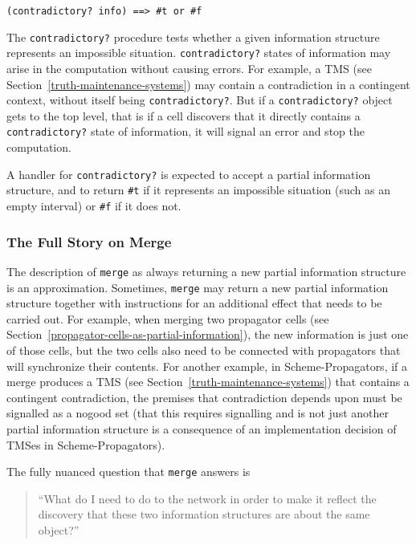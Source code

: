 \documentclass[12pt,letterpaper,english]{article}
\begin{document}
\texttt{(contradictory? info)  ==>  {\#}t or {\#}f}

The \texttt{contradictory?} procedure tests whether a given information
structure represents an impossible situation.  \texttt{contradictory?}
states of information may arise in the computation without causing
errors.  For example, a TMS (see Section~\ref{truth-maintenance-systems})
may contain a contradiction in
a contingent context, without itself being \texttt{contradictory?}.  But if
a \texttt{contradictory?} object gets to the top level, that is if a cell
discovers that it directly contains a \texttt{contradictory?} state of
information, it will signal an error and stop the computation.

A handler for \texttt{contradictory?} is expected to accept a partial
information structure, and to return \texttt{{\#}t} if it represents an
impossible situation (such as an empty interval) or \texttt{{\#}f} if it does
not.



\subsubsection{The Full Story on Merge}
\label{the-full-story-on-merge}

The description of \texttt{merge} as always returning a new partial
information structure is an approximation.  Sometimes, \texttt{merge} may
return a new partial information structure together with instructions
for an additional effect that needs to be carried out.  For example,
when merging two propagator cells
(see Section~\ref{propagator-cells-as-partial-information}),
the new information is just one of those cells, but the two cells also
need to be connected with propagators that will synchronize their
contents.  For another example, in Scheme-Propagators, if a merge
produces a TMS (see Section~\ref{truth-maintenance-systems})
that contains a contingent contradiction,
the premises that contradiction depends upon must be signalled as a
nogood set (that this requires signalling and is not just another
partial information structure is a consequence of an implementation
decision of TMSes in Scheme-Propagators).

The fully nuanced question that \texttt{merge} answers is
\begin{quote}

``What do I need to do to the network in order to make it reflect
the discovery that these two information structures are about the
same object?''
\end{quote}
\end{document}
